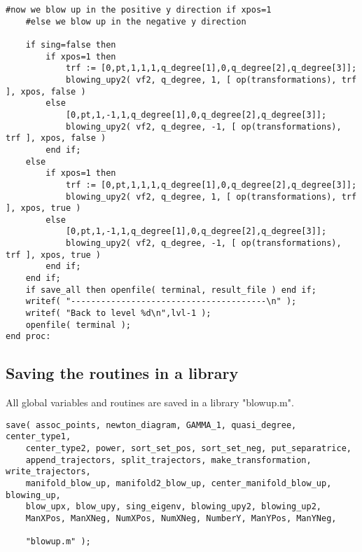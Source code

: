 \documentclass[a4paper,10pt]{article}
\begin{document}
\begin{lstlisting}[name=blowup]
    #now we blow up in the positive y direction if xpos=1
    #else we blow up in the negative y direction

    if sing=false then
        if xpos=1 then
            trf := [0,pt,1,1,1,q_degree[1],0,q_degree[2],q_degree[3]];
            blowing_upy2( vf2, q_degree, 1, [ op(transformations), trf ], xpos, false )
        else
            [0,pt,1,-1,1,q_degree[1],0,q_degree[2],q_degree[3]];
            blowing_upy2( vf2, q_degree, -1, [ op(transformations), trf ], xpos, false )
        end if;
    else
        if xpos=1 then
            trf := [0,pt,1,1,1,q_degree[1],0,q_degree[2],q_degree[3]];
            blowing_upy2( vf2, q_degree, 1, [ op(transformations), trf ], xpos, true )
        else
            [0,pt,1,-1,1,q_degree[1],0,q_degree[2],q_degree[3]];
            blowing_upy2( vf2, q_degree, -1, [ op(transformations), trf ], xpos, true )
        end if;
    end if;
    if save_all then openfile( terminal, result_file ) end if;
    writef( "---------------------------------------\n" );
    writef( "Back to level %d\n",lvl-1 );
    openfile( terminal );
end proc:
\end{lstlisting}

\subsection{Saving the routines in a library}

All global variables and routines are saved in a library "blowup.m".

\begin{lstlisting}[name=blowup]
save( assoc_points, newton_diagram, GAMMA_1, quasi_degree, center_type1,
    center_type2, power, sort_set_pos, sort_set_neg, put_separatrice,
    append_trajectors, split_trajectors, make_transformation, write_trajectors,
    manifold_blow_up, manifold2_blow_up, center_manifold_blow_up, blowing_up,
    blow_upx, blow_upy, sing_eigenv, blowing_upy2, blowing_up2,
    ManXPos, ManXNeg, NumXPos, NumXNeg, NumberY, ManYPos, ManYNeg,

    "blowup.m" );
\end{lstlisting}
\end{document}

